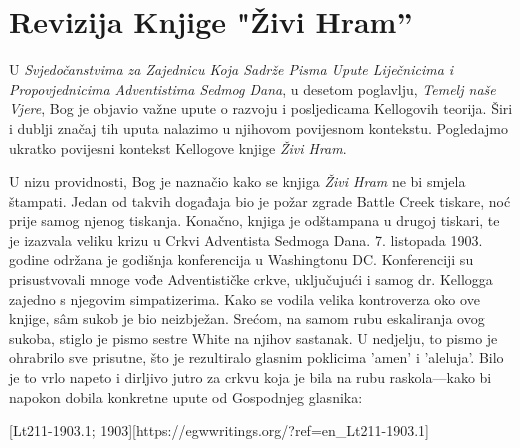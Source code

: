 \chapter{Revizija Knjige "Živi Hram”}

U \textit{Svjedočanstvima za Zajednicu Koja Sadrže Pisma Upute Liječnicima i Propovjednicima Adventistima Sedmog Dana}, u desetom poglavlju, \textit{Temelj naše Vjere}, Bog je objavio važne upute o razvoju i posljedicama Kellogovih teorija. Širi i dublji značaj tih uputa nalazimo u njihovom povijesnom kontekstu. Pogledajmo ukratko povijesni kontekst Kellogove knjige \textit{Živi Hram}.

U nizu providnosti, Bog je naznačio kako se knjiga \textit{Živi Hram} ne bi smjela štampati. Jedan od takvih događaja bio je požar zgrade Battle Creek tiskare, noć prije samog njenog tiskanja. Konačno, knjiga je odštampana u drugoj tiskari, te je izazvala veliku krizu u Crkvi Adventista Sedmoga Dana. 7. listopada 1903. godine održana je godišnja konferencija u Washingtonu DC. Konferenciji su prisustvovali mnoge vođe Adventističke crkve, uključujući i samog dr. Kellogga zajedno s njegovim simpatizerima. Kako se vodila velika kontroverza oko ove knjige, sâm sukob je bio neizbježan. Srećom, na samom rubu eskaliranja ovog sukoba, stiglo je pismo sestre White na njihov sastanak. U nedjelju, to pismo je ohrabrilo sve prisutne, što je rezultiralo glasnim poklicima 'amen' i 'aleluja'. Bilo je to vrlo napeto i dirljivo jutro za crkvu koja je bila na rubu raskola—kako bi napokon dobila konkretne upute od Gospodnjeg glasnika:

[Lt211-1903.1; 1903][https://egwwritings.org/?ref=en\_Lt211-1903.1]

